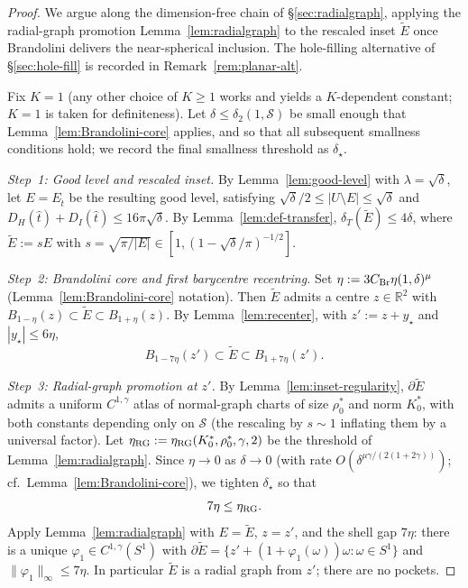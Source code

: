 \documentclass[11pt]{amsart}
\newcommand{\R}{\mathbb R}
\newcommand{\Et}{E_{\hat t}}
\newcommand{\dT}{\delta_T}
\newcommand{\Etil}{\widetilde E}
\newcommand{\Sclass}{\mathcal S}
\begin{document}
\begin{proof}
We argue along the dimension-free chain of \S\ref{sec:radialgraph},
applying the radial-graph promotion Lemma~\ref{lem:radialgraph} to
the rescaled inset $\Etil$ once Brandolini delivers the
near-spherical inclusion.  The hole-filling alternative of
\S\ref{sec:hole-fill} is recorded in Remark~\ref{rem:planar-alt}.

Fix \(K=1\) (any other choice of \(K\ge 1\) works and yields a
\(K\)-dependent constant; \(K=1\) is taken for definiteness).  Let
\(\delta\le\delta_2(1,\Sclass)\) be small enough that
Lemma~\ref{lem:Brandolini-core} applies, and so that all subsequent
smallness conditions hold; we record the final smallness threshold
as \(\delta_\star\).

\emph{Step~1: Good level and rescaled inset.}
By Lemma~\ref{lem:good-level} with \(\lambda=\sqrt\delta\), let
\(E=\Et\) be the resulting good level, satisfying
\(\sqrt\delta/2\le|U\setminus E|\le\sqrt\delta\) and
\(D_H(\hat t)+D_I(\hat t)\le 16\pi\sqrt\delta\).  By
Lemma~\ref{lem:def-transfer}, \(\dT(\Etil)\le 4\delta\), where
\(\Etil:=sE\) with \(s=\sqrt{\pi/|E|}\in[1,(1-\sqrt\delta/\pi)^{-1/2}]\).

\emph{Step~2: Brandolini core and first barycentre recentring.}
Set \(\eta:=3C_{\rm Br}\eta(1,\delta)^\mu\) (Lemma~\ref{lem:Brandolini-core}
notation).  Then $\Etil$ admits a centre $z\in\R^2$ with
\(B_{1-\eta}(z)\subset\Etil\subset B_{1+\eta}(z)\).  By
Lemma~\ref{lem:recenter}, with \(z':=z+y_\star\) and
\(|y_\star|\le 6\eta\),
\begin{equation}\label{eq:rec-annulus}
   B_{1-7\eta}(z')\subset\Etil\subset B_{1+7\eta}(z').
\end{equation}

\emph{Step~3: Radial-graph promotion at $z'$.}
By Lemma~\ref{lem:inset-regularity}, $\partial\Etil$ admits a uniform
$C^{1,\gamma}$ atlas of normal-graph charts of size $\rho_0^\ast$ and
norm $K_0^\ast$, with both constants depending only on $\Sclass$
(the rescaling by $s\sim 1$ inflating them by a universal factor).
Let
\(\eta_{\rm RG}:=\eta_{\rm RG}(K_0^\ast,\rho_0^\ast,\gamma,2)\) be
the threshold of Lemma~\ref{lem:radialgraph}.  Since $\eta\to 0$ as
$\delta\to 0$ (with rate $O(\delta^{\mu\gamma/(2(1+2\gamma))})$;
cf.\ Lemma~\ref{lem:Brandolini-core}), we tighten $\delta_\star$ so
that
\begin{equation}\label{eq:smallness-RG-1}
   7\eta\le\eta_{\rm RG}.
\end{equation}
Apply Lemma~\ref{lem:radialgraph} with $E=\Etil$, $z=z'$, and the
shell gap $7\eta$: there is a unique
$\varphi_1\in C^{1,\gamma}(S^{1})$ with
\(\partial\Etil=\{z'+(1+\varphi_1(\omega))\omega:\omega\in S^{1}\}\)
and $\|\varphi_1\|_\infty\le 7\eta$.  In particular $\Etil$ is a
radial graph from $z'$; there are no pockets.


\end{proof}
\end{document}
